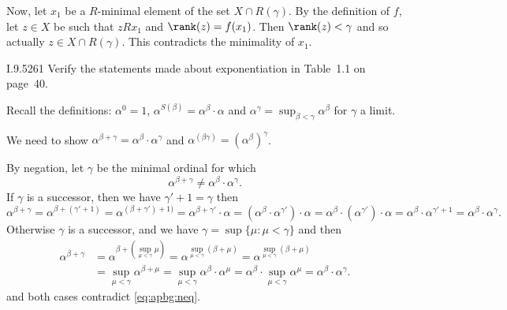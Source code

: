 Now, let \(x_1\) be a $R$-minimal element of the set \(X\cap R(\gamma)\).
By the definition of $f$, 
let \(z\in X\) be such that \(z R x_1\) and \(\rank(z)=f(x_1)\).
Then \(\rank(z) < \gamma\) and so actually \(z \in X\cap R(\gamma)\).
This contradicts the minimality of \(x_1\).

\begin{lexcopy}{I.9.52}{61}
Verify the statements made about exponentiation in Table~1.1
on page~40.
\end{lexcopy}
Recall the definitions:
\(\alpha^0=1\),
\(\alpha^{S(\beta)}=\alpha^\beta\cdot\alpha\)
and
\(\alpha^{\gamma}=\sup_{\beta<\gamma}\alpha^\beta\) for \(\gamma\) a limit.

We need to show
\(\alpha^{\beta+\gamma} = \alpha^\beta \cdot \alpha^\gamma\)
and 
\(\alpha^{(\beta\gamma)} = (\alpha^\beta)^\gamma\).

By negation, let \(\gamma\) be the minimal ordinal for which
\begin{equation} \label{eq:apbg:neq}
\alpha^{\beta+\gamma} \neq  \alpha^\beta \cdot \alpha^\gamma.
\end{equation}
If \(\gamma\) is a successor, then we have \(\gamma'+1=\gamma\)
then
\begin{equation*}
\alpha^{\beta+\gamma}
= \alpha^{\beta+(\gamma'+1)} 
= \alpha^{(\beta+\gamma')+1)} 
= \alpha^{\beta+\gamma'}\cdot\alpha
= \left(\alpha^\beta\cdot\alpha^{\gamma'}\right)\cdot\alpha
= \alpha^\beta\cdot\left(\alpha^{\gamma'}\right)\cdot\alpha
= \alpha^\beta\cdot\alpha^{\gamma'+1}
= \alpha^\beta\cdot\alpha^\gamma.
\end{equation*}
Otherwise \(\gamma\) is a successor,
and we have \(\gamma = \sup\{\mu: \mu<\gamma\}\) and then
\begin{align*}
\alpha^{\beta+\gamma}
&= \alpha^{\beta+(\sup_{\mu<\gamma}\mu)}
= \alpha^{\sup_{\mu<\gamma}(\beta+\mu)}
= \alpha^{\sup_{\mu<\gamma}(\beta+\mu)} \\
&= \sup_{\mu<\gamma}\alpha^{\beta+\mu}
= \sup_{\mu<\gamma}\alpha^\beta\cdot\alpha^\mu
= \alpha^\beta\cdot\sup_{\mu<\gamma}\alpha^\mu
= \alpha^\beta\cdot\alpha^\gamma.
\end{align*}
and both cases contradict \eqref{eq:apbg:neq}.

